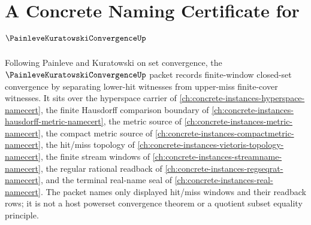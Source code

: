 \chapter{A Concrete Naming Certificate for $\PainleveKuratowskiConvergenceUp$}
\label{ch:concrete-instances-painleve-kuratowski-convergence-namecert}

Following Painleve and Kuratowski on set convergence, the $\PainleveKuratowskiConvergenceUp$ packet records finite-window closed-set convergence by separating lower-hit witnesses from upper-miss finite-cover witnesses. It sits over the hyperspace carrier of \autoref{ch:concrete-instances-hyperspace-namecert}, the finite Hausdorff comparison boundary of \autoref{ch:concrete-instances-hausdorff-metric-namecert}, the metric source of \autoref{ch:concrete-instances-metric-namecert}, the compact metric source of \autoref{ch:concrete-instances-compactmetric-namecert}, the hit/miss topology of \autoref{ch:concrete-instances-vietoris-topology-namecert}, the finite stream windows of \autoref{ch:concrete-instances-streamname-namecert}, the regular rational readback of \autoref{ch:concrete-instances-regseqrat-namecert}, and the terminal real-name seal of \autoref{ch:concrete-instances-real-namecert}. The packet names only displayed hit/miss windows and their readback rows; it is not a host powerset convergence theorem or a quotient subset equality principle.

